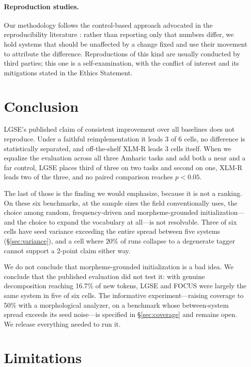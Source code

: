 \documentclass[11pt]{article}
\begin{document}
\paragraph{Reproduction studies.} Our methodology follows the control-based
approach advocated in the reproducibility literature
\citep{belz-etal-2021-systematic}: rather than reporting only that numbers
differ, we hold systems that should be unaffected by a change fixed and use
their movement to attribute the difference. Reproductions of this kind are
usually conducted by third parties; this one is a self-examination, with the
conflict of interest and its mitigations stated in the Ethics Statement.

\section{Conclusion}

LGSE's published claim of consistent improvement over all baselines does not
reproduce. Under a faithful reimplementation it leads 3 of 6 cells, no
difference is statistically separated, and off-the-shelf XLM-R leads 3 cells
itself. When we equalize the evaluation across all three Amharic tasks and
add both a near and a far control, LGSE places third of three on two tasks
and second on one, XLM-R leads two of the three, and no paired comparison
reaches $p < 0.05$.

The last of those is the finding we would emphasize, because it is not a
ranking. On these six benchmarks, at the sample sizes the field conventionally
uses, the choice among random, frequency-driven and morpheme-grounded
initialization---and the choice to expand the vocabulary at all---is not
resolvable. Three of six cells have seed variance exceeding the entire spread
between five systems (\S\ref{sec:variance}), and a cell where 20\% of runs
collapse to a degenerate tagger cannot support a 2-point claim either way.

We do not conclude that morpheme-grounded initialization is a bad idea. We
conclude that the published evaluation did not test it: with genuine
decomposition reaching 16.7\% of new tokens, LGSE and FOCUS were largely the
same system in five of six cells. The informative experiment---raising
coverage to 50\% with a morphological analyzer, on a benchmark whose
between-system spread exceeds its seed noise---is specified in
\S\ref{sec:coverage} and remains open. We release everything needed to run
it.

\section*{Limitations}
\end{document}
